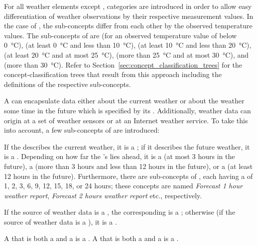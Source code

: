 For all weather elements except , categories are introduced in order to allow easy differentiation of weather observations by their respective measurement values. In the case of , the sub-concepts differ from each other by the observed temperature values. The sub-concepts of  are  (for an observed temperature value of below \SI{0}{\celsius}),  (at least \SI{0}{\celsius} and less than \SI{10}{\celsius}),  (at least \SI{10}{\celsius} and less than \SI{20}{\celsius}),  (at least \SI{20}{\celsius} and at most \SI{25}{\celsius}),  (more than \SI{25}{\celsius} and at most \SI{30}{\celsius}), and  (more than \SI{30}{\celsius}). Refer to Section~\ref{sec:concept_classification_trees} for the concept-classification trees that result from this approach including the definitions of the respective sub-concepts.

A  can encapsulate data either about the current weather or about the weather some time in the future which is specified by its . Additionally, weather data can origin at a set of weather sensors or at an Internet weather service. To take this into account, a few sub-concepts of  are introduced:

If the  describes the current weather, it is a ; if it describes the future weather, it is a . Depending on how far the 's  lies ahead, it is a  (at most 3 hours in the future), a  (more than 3 hours and less than 12 hours in the future), or a  (at least 12 hours in the future). Furthermore, there are sub-concepts of , each having a  of 1, 2, 3, 6, 9, 12, 15, 18, or 24 hours; these concepts are named \emph{Forecast 1 hour weather report}, \emph{Forecast 2 hours weather report} etc., respectively.

If the source of weather data is a , the corresponding  is a ; otherwise (if the source of weather data is a ), it is a .

A  that is both a  and a  is a . A  that is both a  and a  is a .

